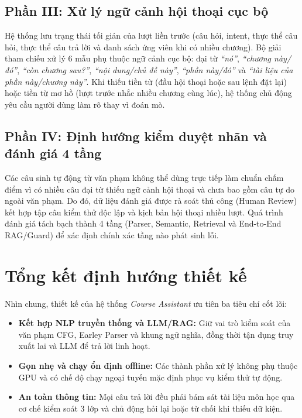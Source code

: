 \subsection{Phần III: Xử lý ngữ cảnh hội thoại cục bộ}

Hệ thống lưu trạng thái tối giản của lượt liền trước (câu hỏi, intent, thực thể câu hỏi, thực thể câu trả lời và danh sách ứng viên khi có nhiều chương). Bộ giải tham chiếu xử lý 6 mẫu phụ thuộc ngữ cảnh cục bộ: đại từ \emph{``nó''}, \emph{``chương này/đó''}, \emph{``còn chương sau?''}, \emph{``nội dung/chủ đề này''}, \emph{``phần này/đó''} và \emph{``tài liệu của phần này/chương này''}. Khi thiếu tiền từ (đầu hội thoại hoặc sau lệnh đặt lại) hoặc tiền từ mơ hồ (lượt trước nhắc nhiều chương cùng lúc), hệ thống chủ động yêu cầu người dùng làm rõ thay vì đoán mò.

\subsection{Phần IV: Định hướng kiểm duyệt nhãn và đánh giá 4 tầng}

Các câu sinh tự động từ văn phạm không thể dùng trực tiếp làm chuẩn chấm điểm vì có nhiều câu đại từ thiếu ngữ cảnh hội thoại và chưa bao gồm câu tự do ngoài văn phạm. Do đó, dữ liệu đánh giá được rà soát thủ công (Human Review) kết hợp tập câu kiểm thử độc lập và kịch bản hội thoại nhiều lượt. Quá trình đánh giá tách bạch thành 4 tầng (Parser, Semantic, Retrieval và End-to-End RAG/Guard) để xác định chính xác tầng nào phát sinh lỗi.

\section{Tổng kết định hướng thiết kế}

Nhìn chung, thiết kế của hệ thống \emph{Course Assistant} ưu tiên ba tiêu chí cốt lõi:
\begin{itemize}
  \item \textbf{Kết hợp NLP truyền thống và LLM/RAG:} Giữ vai trò kiểm soát của văn phạm CFG, Earley Parser và khung ngữ nghĩa, đồng thời tận dụng truy xuất lai và LLM để trả lời linh hoạt.
  \item \textbf{Gọn nhẹ và chạy ổn định offline:} Các thành phần xử lý không phụ thuộc GPU và có chế độ chạy ngoại tuyến mặc định phục vụ kiểm thử tự động.
  \item \textbf{An toàn thông tin:} Mọi câu trả lời đều phải bám sát tài liệu môn học qua cơ chế kiểm soát 3 lớp và chủ động hỏi lại hoặc từ chối khi thiếu dữ kiện.
\end{itemize}
